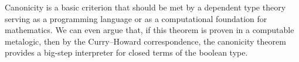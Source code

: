 \noindent
Canonicity is a basic criterion that should be met by a dependent type theory serving as
a programming language or as a computational foundation for mathematics.
We can even argue that, if this theorem is proven in a computable meta\-logic, 
then by the Curry–Howard correspondence, the canonicity theorem provides a big-step
interpreter for closed terms of the boolean type.%

